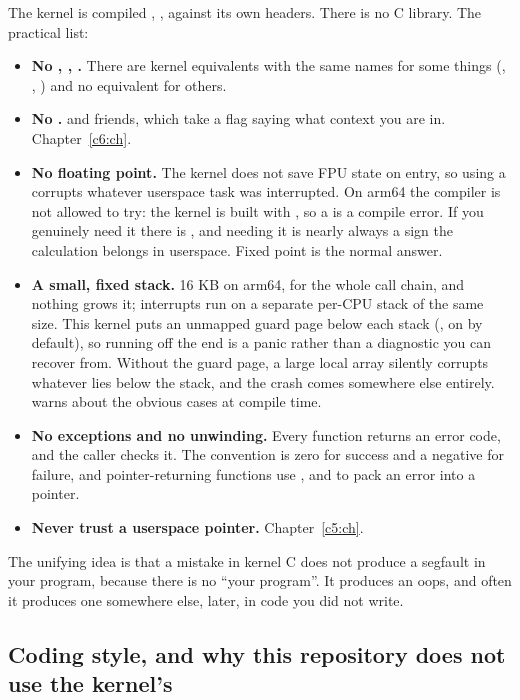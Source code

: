 The kernel is compiled , , against its own headers. There is no
C library. The practical list:
\begin{itemize}
  \item \textbf{No , , .} There are kernel equivalents
    with the same names for some things (, , ) and no
    equivalent for others.
  \item \textbf{No .}  and friends, which take a flag saying what context
    you are in. Chapter~\ref{c6:ch}.
  \item \textbf{No floating point.} The kernel does not save FPU state on entry, so using a
     corrupts whatever userspace task was interrupted. On arm64 the compiler is not
    allowed to try: the kernel is built with , so a  is a
    compile error. If you genuinely need it there is , and needing it is
    nearly always a sign the calculation belongs in userspace. Fixed point is the normal answer.
  \item \textbf{A small, fixed stack.} 16 KB on arm64, for the whole call chain, and nothing grows
    it; interrupts run on a separate per-CPU stack of the same size. This kernel puts an unmapped
    guard page below each stack (, on by default), so running off the end is
    a  panic rather than a diagnostic you can recover from. Without the
    guard page, a large local array silently corrupts whatever lies below the stack, and the crash
    comes somewhere else entirely.  warns about the obvious cases at
    compile time.
  \item \textbf{No exceptions and no unwinding.} Every function returns an error code, and the
    caller checks it. The convention is zero for success and a negative  for failure,
    and pointer-returning functions use ,  and  to pack an
    error into a pointer.
  \item \textbf{Never trust a userspace pointer.} Chapter~\ref{c5:ch}.
\end{itemize}
The unifying idea is that a mistake in kernel C does not produce a segfault in your program, because
there is no ``your program''. It produces an oops, and often it produces one somewhere else, later,
in code you did not write.

\subsection{Coding style, and why this repository does not use the kernel's}
\label{c4:app:a9}

